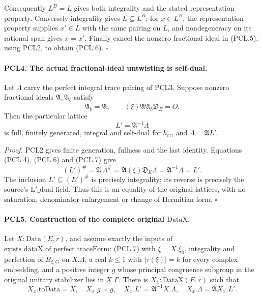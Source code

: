 Consequently \(L^B=L\) gives both integrality and the stated
representation property.  Conversely integrality gives
\(L\subseteq L^B\); for \(x\in L^B\), the representation
property supplies \(x'\in L\) with the same pairing on
\(L\), and nondegeneracy on its rational span gives
\(x=x'\).  Finally cancel the nonzero fractional ideal in
(PCL.5), using PCL2, to obtain (PCL.6).
\hfill\(\square\)

\paragraph{PCL4. The actual fractional-ideal untwisting is self-dual.}
\label{claim:PCL4}
Let \(\Lambda\) carry the perfect integral trace pairing
of PCL3.  Suppose nonzero fractional ideals
\(\mathfrak A,\mathfrak A_b\) satisfy
\[
 \mathfrak A_b=\overline{\mathfrak A},\qquad
             (\xi)\mathfrak A\mathfrak A_b\mathfrak D_E=O.
                                                               \tag{PCL.7}
\]
Then the particular lattice
\[
               L'=\mathfrak A^{-1}\Lambda            \tag{PCL.8}
\]
is full, finitely generated, integral and self-dual for
\(h_G\), and \(\Lambda=\mathfrak A L'\).

\emph{Proof.}
PCL2 gives finite generation, fullness and the last
identity.  Equations (PCL.4), (PCL.6) and (PCL.7) give
\[
 (L')^\#=\overline{\mathfrak A}\,\Lambda^\#
       =\overline{\mathfrak A}(\xi)\mathfrak D_E\Lambda
       =\mathfrak A^{-1}\Lambda=L'.                  \tag{PCL.9}
\]
The inclusion \(L'\subseteq(L')^\#\) is precisely
integrality; its reverse is precisely the source's
\(\mathrm{L'\_dual}\) field.  Thus this is an equality
of the original lattices, with no saturation, denominator
enlargement or change of Hermitian form.
\hfill\(\square\)

\paragraph{PCL5. Construction of the complete original \(\mathrm{DataX}\).}
\label{claim:PCL5}
Let \(X:\mathrm{Data}(E,r)\), and assume exactly the inputs
of \(\mathrm{exists\_dataX\_of\_perfect\_traceForm}\):
(PCL.7) with \(\xi=X.\xi_0\), integrality and perfection
of \(B_{\xi,G}\) on \(X.\Lambda\), a real \(k\le1\)
with \(|\tau(\xi)|=k\) for every complex embedding, and
a positive integer \(g\) whose principal congruence
subgroup in the original unitary stabilizer lies in
\(X.\Gamma\).  There is \(X_x:\mathrm{DataX}(E,r)\) such
that
\[
 X_x.\mathrm{toData}=X,\quad X_x.g=g,\quad
 X_x.L'=\mathfrak A^{-1}X.\Lambda,\quad
 X_x.\Lambda=\mathfrak A X_x.L'.                     \tag{PCL.10}
\]

